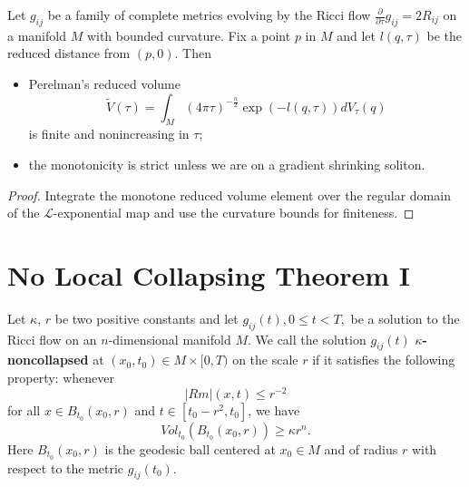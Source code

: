 \begin{theorem}
  \label{thm:cz-monotonicity-of-reduced-volume}
Let $g_{ij}$ be a family of complete metrics evolving by the Ricci
flow $\frac{\partial}{\partial \tau}g_{ij}=2R_{ij}$ on a manifold
$M$ with bounded curvature. Fix a point $p$ in $M$ and let
$l(q,\tau)$ be the reduced distance from $(p,0)$. Then
\begin{itemize}
\item[(i)] Perelman's reduced volume
$$
\tilde{V}(\tau)
=\int_M(4\pi\tau)^{-\frac{n}{2}}\exp(-l(q,\tau))dV_{\tau}(q)
$$
is finite and nonincreasing in $\tau$; \item[(ii)] the
monotonicity is strict unless we are on a gradient shrinking
soliton.
\end{itemize}
\end{theorem}

\begin{proof}
  \sketch Integrate the monotone reduced volume element over the regular domain of the $\mathcal L$-exponential map and use the curvature bounds for finiteness.
\end{proof}

\section{No Local Collapsing Theorem I}

\begin{definition}
  \label{def:cz-kappa-noncollapsing-at-a-scale}
Let $\kappa$, $r$ be two positive constants and let $g_{ij}(t), 0
\leq t <T,$ be a solution to the Ricci flow on an $n$-dimensional
manifold $M$. We call the solution $g_{ij}(t)$
\textbf{$\kappa$-noncollapsed} at $(x_0,t_0)\in M \times [0,T)$ on
the scale $r$  if it satisfies the
following property: whenever
$$
|Rm|(x,t)\leq r^{-2}
$$
for all $x \in B_{t_0}(x_0,r)$ and $t \in [t_0-r^2,t_0]$, we have
$$Vol_{t_0}(B_{t_0}(x_0,r)) \geq \kappa r^n.$$ Here $B_{t_0}(x_0,r)$ is
the geodesic ball centered at $x_0\in M $ and of radius $r$ with
respect to the metric $g_{ij}(t_0)$.
\end{definition}


